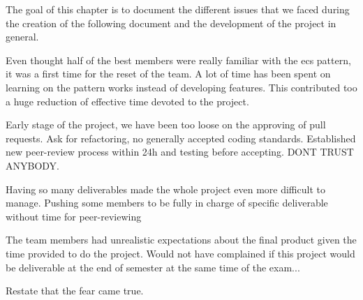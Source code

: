 The goal of this chapter is to document the different issues that we faced during the creation of the following document and the development of the project in general.

Even thought half of the best members were really familiar with the \gls{ecs} pattern, it was a first time for the reset of the team. A lot of time has been spent on learning on the pattern works instead of developing features. This contributed too a huge reduction of effective time devoted to the project.


Early stage of the project, we have been too loose on the approving of pull requests. Ask for refactoring, no generally accepted coding standards. Established new peer-review process within 24h and testing before accepting. DONT TRUST ANYBODY.

Having so many deliverables made the whole project even more difficult to manage. Pushing some members to be fully in charge of specific deliverable without time for peer-reviewing

The team members had unrealistic expectations about the final product given the time provided to do the project. Would not have complained if this project would be deliverable at the end of semester at the same time of the exam...

Restate that the fear came true. 
